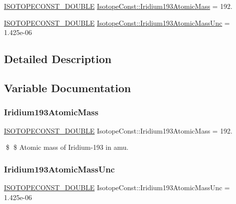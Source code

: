 \begin{DoxyCompactItemize}
\item 
\mbox{\hyperlink{group___isotope_const-_macros_ga8f45a7272ce02c0b4c65c44636ed719a}{I\+S\+O\+T\+O\+P\+E\+C\+O\+N\+S\+T\+\_\+\+D\+O\+U\+B\+LE}} \mbox{\hyperlink{group___isotope_const-_iridium-_ir193_gaf51888ea0689673c976d86b3abc3f795}{Isotope\+Const\+::\+Iridium193\+Atomic\+Mass}} = 192.
\item 
\mbox{\hyperlink{group___isotope_const-_macros_ga8f45a7272ce02c0b4c65c44636ed719a}{I\+S\+O\+T\+O\+P\+E\+C\+O\+N\+S\+T\+\_\+\+D\+O\+U\+B\+LE}} \mbox{\hyperlink{group___isotope_const-_iridium-_ir193_gacf178ffdc7966f089dafae7b4bea5529}{Isotope\+Const\+::\+Iridium193\+Atomic\+Mass\+Unc}} = 1.\+425e-\/06
\end{DoxyCompactItemize}


\subsection{Detailed Description}


\subsection{Variable Documentation}
\mbox{\label{group___isotope_const-_iridium-_ir193_gaf51888ea0689673c976d86b3abc3f795}} 
\subsubsection{\texorpdfstring{Iridium193\+Atomic\+Mass}{Iridium193AtomicMass}}
{\footnotesize\ttfamily \mbox{\hyperlink{group___isotope_const-_macros_ga8f45a7272ce02c0b4c65c44636ed719a}{I\+S\+O\+T\+O\+P\+E\+C\+O\+N\+S\+T\+\_\+\+D\+O\+U\+B\+LE}} Isotope\+Const\+::\+Iridium193\+Atomic\+Mass = 192.}

\$ \$ Atomic mass of Iridium-\/193 in amu. \mbox{\label{group___isotope_const-_iridium-_ir193_gacf178ffdc7966f089dafae7b4bea5529}} 
\subsubsection{\texorpdfstring{Iridium193\+Atomic\+Mass\+Unc}{Iridium193AtomicMassUnc}}
{\footnotesize\ttfamily \mbox{\hyperlink{group___isotope_const-_macros_ga8f45a7272ce02c0b4c65c44636ed719a}{I\+S\+O\+T\+O\+P\+E\+C\+O\+N\+S\+T\+\_\+\+D\+O\+U\+B\+LE}} Isotope\+Const\+::\+Iridium193\+Atomic\+Mass\+Unc = 1.\+425e-\/06}

